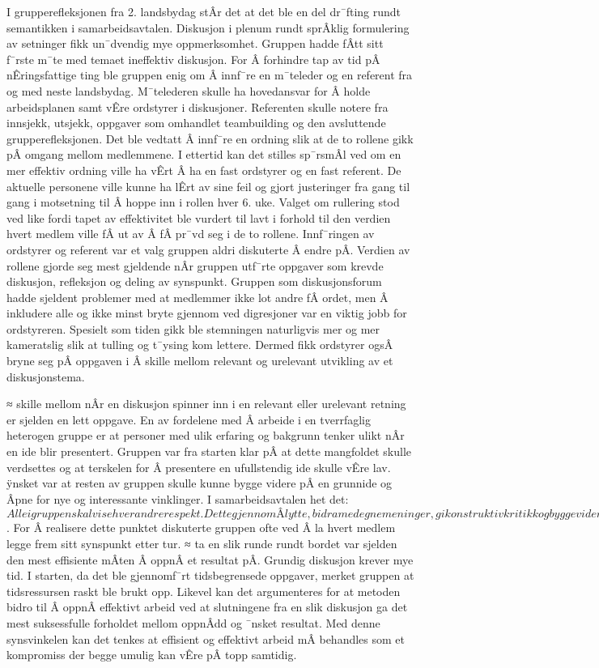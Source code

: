 I grupperefleksjonen fra 2. landsbydag stÂr det at det ble en del dr¯fting rundt semantikken i samarbeidsavtalen. 
Diskusjon i plenum rundt sprÂklig formulering av setninger fikk un¯dvendig mye oppmerksomhet.
Gruppen hadde fÂtt sitt f¯rste m¯te med temaet ineffektiv diskusjon.
For Â forhindre tap av tid pÂ nÊringsfattige ting ble gruppen enig om Â innf¯re en m¯teleder og en referent fra og med neste landsbydag.
M¯telederen skulle ha hovedansvar for Â holde arbeidsplanen samt vÊre ordstyrer i diskusjoner.
Referenten skulle notere fra innsjekk, utsjekk, oppgaver som omhandlet teambuilding og den avsluttende grupperefleksjonen.
Det ble vedtatt Â innf¯re en ordning slik at de to rollene gikk pÂ omgang mellom medlemmene.
I ettertid kan det stilles sp¯rsmÂl ved om en mer effektiv ordning ville ha vÊrt Â ha en fast ordstyrer og en fast referent.
De aktuelle personene ville kunne ha lÊrt av sine feil og gjort justeringer fra gang til gang i motsetning til Â hoppe inn i rollen hver 6. uke.
Valget om rullering stod ved like fordi tapet av effektivitet ble vurdert til lavt i forhold til den verdien hvert medlem ville fÂ ut av Â fÂ pr¯vd seg i de to rollene.
Innf¯ringen av ordstyrer og referent var et valg gruppen aldri diskuterte Â endre pÂ. 
Verdien av rollene gjorde seg mest gjeldende nÂr gruppen utf¯rte oppgaver som krevde diskusjon, refleksjon og deling av synspunkt.
Gruppen som diskusjonsforum hadde sjeldent problemer med at medlemmer ikke lot andre fÂ ordet, men Â inkludere alle og ikke minst bryte gjennom ved digresjoner var en viktig jobb for ordstyreren. 
Spesielt som tiden gikk ble stemningen naturligvis mer og mer kameratslig slik at tulling og t¯ysing kom lettere.
Dermed fikk ordstyrer ogsÂ bryne seg pÂ oppgaven i Â skille mellom relevant og urelevant utvikling av et diskusjonstema.

≈ skille mellom nÂr en diskusjon spinner inn i en relevant eller urelevant retning er sjelden en lett oppgave.
En av fordelene med Â arbeide i en tverrfaglig heterogen gruppe er at personer med ulik erfaring og bakgrunn tenker ulikt nÂr en ide blir presentert.
Gruppen var fra starten klar pÂ at dette mangfoldet skulle verdsettes og at terskelen for Â presentere en ufullstendig ide skulle vÊre lav.
ÿnsket var at resten av gruppen skulle kunne bygge videre pÂ en grunnide og Âpne for nye og interessante vinklinger. 
I samarbeidsavtalen het det: $Alle i gruppen skal vise hverandre respekt. Dette gjennom Â lytte, bidra med egne meninger, gi konstruktiv kritikk og bygge videre pÂ andres ideer.$.
For Â realisere dette punktet diskuterte gruppen ofte ved Â la hvert medlem legge frem sitt synspunkt etter tur.
≈ ta en slik runde rundt bordet var sjelden den mest effisiente mÂten Â oppnÂ et resultat pÂ.
Grundig diskusjon krever mye tid. 
I starten, da det ble gjennomf¯rt tidsbegrensede oppgaver, merket gruppen at tidsressursen raskt ble brukt opp.
Likevel kan det argumenteres for at metoden bidro til Â oppnÂ effektivt arbeid ved at slutningene fra en slik diskusjon ga det mest suksessfulle forholdet mellom oppnÂdd og ¯nsket resultat.
Med denne synsvinkelen kan det tenkes at effisient og effektivt arbeid mÂ behandles som et kompromiss der begge umulig kan vÊre pÂ topp samtidig.


